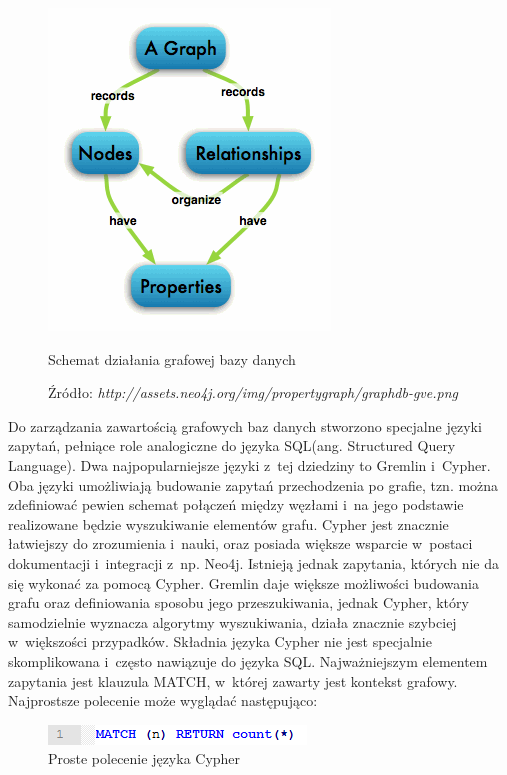 \begin{figure}[H]
	\centering
	\includegraphics[scale=1]{images/graphdb.png}
	\caption{Schemat działania grafowej bazy danych}
	 \caption*{\small Źródło: \emph{http://assets.neo4j.org/img/propertygraph/graphdb-gve.png}}
	\label{fig:dbschema}
\end{figure}

Do zarządzania zawartością grafowych baz danych stworzono specjalne języki zapytań, pełniące role analogiczne do języka SQL(ang. Structured Query Language).
Dwa najpopularniejsze języki z~tej dziedziny to Gremlin i~Cypher. Oba języki umożliwiają budowanie zapytań przechodzenia po grafie, tzn. można zdefiniować pewien schemat połączeń między węzłami i~na jego podstawie realizowane będzie wyszukiwanie elementów grafu. Cypher jest znacznie łatwiejszy do zrozumienia i~nauki, oraz posiada większe wsparcie w~postaci dokumentacji i~integracji z~np. Neo4j. Istnieją jednak zapytania, których nie da się wykonać za pomocą Cypher. Gremlin daje większe możliwości budowania grafu oraz definiowania sposobu jego przeszukiwania, jednak Cypher, który samodzielnie wyznacza algorytmy wyszukiwania, działa znacznie szybciej w~większości przypadków. Składnia języka Cypher nie jest specjalnie skomplikowana i~często nawiązuje do języka SQL. Najważniejszym elementem zapytania jest klauzula MATCH, w~której zawarty jest kontekst grafowy. Najprostsze polecenie może wyglądać następująco:

\begin{figure}[H]
	\centering
	\includegraphics{images/cypher_q1.png}
	\caption{Proste polecenie języka Cypher}
\end{figure}

